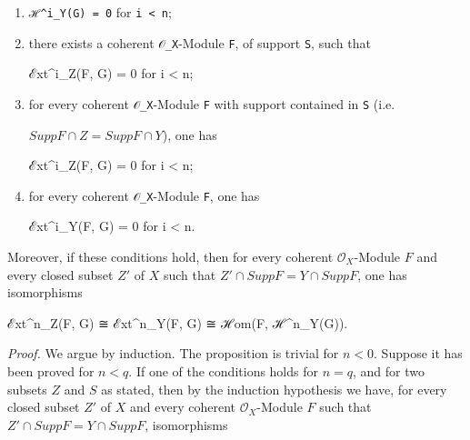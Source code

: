 \documentclass[
  11pt,
  a4paper,
]{book}
\newenvironment{Shaded}{}{}
\newcommand{\NormalTok}[1]{#1}
\begin{document}
\begin{enumerate}
\def\labelenumi{\arabic{enumi}.}
\item
  \texttt{ℋ\^{}i\_Y(G)\ =\ 0} for \texttt{i\ \textless{}\ n};
\item
  there exists a coherent \texttt{𝒪\_X}-Module \texttt{F}, of support
  \texttt{S}, such that

\begin{Shaded}
\begin{Highlighting}[]
\NormalTok{ℰxt\^{}i\_Z(F, G) = 0 for i \textless{} n;}
\end{Highlighting}
\end{Shaded}
\item
  for every coherent \texttt{𝒪\_X}-Module \texttt{F} with support
  contained in \texttt{S} (i.e.

  \(Supp F \cap Z = Supp F \cap Y\)), one has

\begin{Shaded}
\begin{Highlighting}[]
\NormalTok{ℰxt\^{}i\_Z(F, G) = 0 for i \textless{} n;}
\end{Highlighting}
\end{Shaded}
\item
  for every coherent \texttt{𝒪\_X}-Module \texttt{F}, one has

\begin{Shaded}
\begin{Highlighting}[]
\NormalTok{ℰxt\^{}i\_Y(F, G) = 0 for i \textless{} n.}
\end{Highlighting}
\end{Shaded}
\end{enumerate}

Moreover, if these conditions hold, then for every coherent
\(\mathcal{O}_{X}\)-Module \(F\) and every closed subset \(Z'\) of \(X\)
such that \(Z' \cap Supp F = Y \cap Supp F\), one has isomorphisms

\begin{Shaded}
\begin{Highlighting}[]
\NormalTok{ℰxt\^{}n\_Z(F, G) ≅ ℰxt\^{}n\_Y(F, G) ≅ ℋom(F, ℋ\^{}n\_Y(G)).}
\end{Highlighting}
\end{Shaded}

\emph{Proof.} We argue by induction. The proposition is trivial for
\(n < 0\). Suppose it has been proved for \(n < q\). If one of the
conditions holds for \(n = q\), and for two subsets \(Z\) and \(S\) as
stated, then by the induction hypothesis we have, for every closed
subset \(Z'\) of \(X\) and every coherent \(\mathcal{O}_{X}\)-Module
\(F\) such that \(Z' \cap Supp F = Y
\cap Supp F\), isomorphisms
\end{document}
